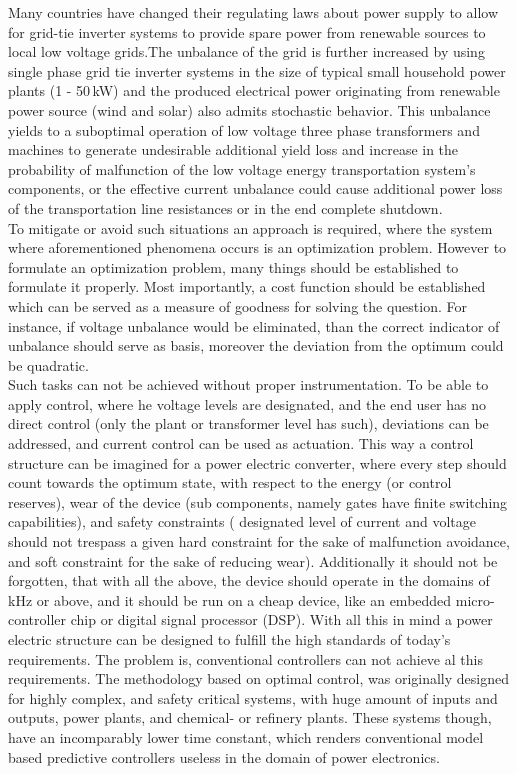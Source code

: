 Many countries have changed their regulating laws about power supply to allow for grid-tie inverter systems to provide spare power from renewable sources to local low voltage grids.The unbalance of the grid is further increased by using single phase grid tie inverter systems in the size of typical small household power plants (1 - 50\,kW) and the produced electrical power originating from renewable power source (wind and solar) also admits stochastic behavior. This unbalance yields to a suboptimal operation of low voltage three phase transformers and machines to generate undesirable additional yield loss and increase in the probability of malfunction of the low voltage energy transportation system's components, or the effective current unbalance could cause additional power loss of the transportation line resistances or in the end complete shutdown.\\
To mitigate or avoid such situations an approach is required, where the system where aforementioned phenomena occurs is an optimization problem. However to formulate an optimization problem, many things should be established to formulate it properly. Most importantly, a cost function should be established which can be served as a measure of goodness for solving the question. For instance, if voltage unbalance would be eliminated, than the correct indicator of unbalance should serve as basis, moreover the deviation from the optimum could be quadratic.\\
Such tasks can not be achieved without proper instrumentation. To be able to apply control, where he voltage levels are designated, and the end user has no direct control (only the plant or transformer level has such), deviations can be addressed, and current control can be used as actuation. This way a control structure can be imagined for a power electric converter, where every step should count towards the optimum state, with respect to the energy (or control reserves), wear of the device (sub components, namely gates have finite switching capabilities), and  safety constraints ( designated level of current and voltage should not trespass a given hard constraint for the sake of malfunction avoidance, and soft constraint for the sake of reducing wear). Additionally it should not be forgotten, that with all the above, the device should operate in the domains of kHz or above, and it should be run on a cheap device, like an embedded micro-controller chip or digital signal processor (DSP). With all this in mind a power electric structure can be designed to fulfill the high standards of today’s requirements. The problem is, conventional controllers can not achieve al this requirements. The methodology based on optimal control, was originally designed for highly complex, and safety critical systems, with huge amount of inputs and outputs, power plants, and chemical- or refinery plants. These systems though, have an incomparably lower time constant, which renders conventional model based predictive controllers useless in the domain of power electronics. \\
